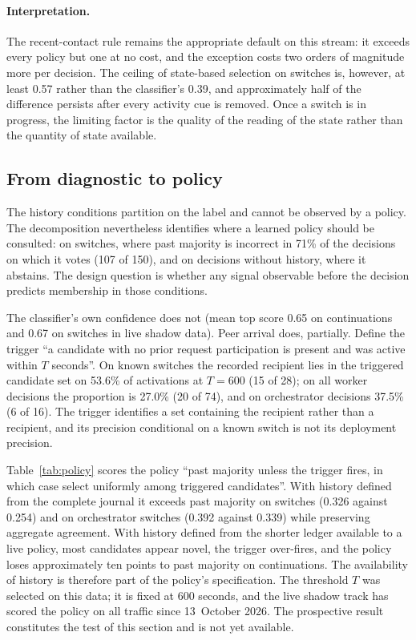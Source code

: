 \documentclass[11pt]{article}
\theoremstyle{definition}
\begin{document}
\paragraph{Interpretation.}
The recent-contact rule remains the appropriate default on this stream: it exceeds every policy but one at no cost, and the exception costs two orders of magnitude more per decision. The ceiling of state-based selection on switches is, however, at least 0.57 rather than the classifier's 0.39, and approximately half of the difference persists after every activity cue is removed. Once a switch is in progress, the limiting factor is the quality of the reading of the state rather than the quantity of state available.

\subsection{From diagnostic to policy}
\label{sec:policy}

The history conditions partition on the label and cannot be observed by a policy. The decomposition nevertheless identifies where a learned policy should be consulted: on switches, where past majority is incorrect in 71\% of the decisions on which it votes (107 of 150), and on decisions without history, where it abstains. The design question is whether any signal observable before the decision predicts membership in those conditions.

The classifier's own confidence does not (mean top score 0.65 on continuations and 0.67 on switches in live shadow data). Peer arrival does, partially. Define the trigger ``a candidate with no prior request participation is present and was active within $T$ seconds''. On known switches the recorded recipient lies in the triggered candidate set on 53.6\% of activations at $T = 600$ (15 of 28); on all worker decisions the proportion is 27.0\% (20 of 74), and on orchestrator decisions 37.5\% (6 of 16). The trigger identifies a set containing the recipient rather than a recipient, and its precision conditional on a known switch is not its deployment precision.

Table~\ref{tab:policy} scores the policy ``past majority unless the trigger fires, in which case select uniformly among triggered candidates''. With history defined from the complete journal it exceeds past majority on switches (0.326 against 0.254) and on orchestrator switches (0.392 against 0.339) while preserving aggregate agreement. With history defined from the shorter ledger available to a live policy, most candidates appear novel, the trigger over-fires, and the policy loses approximately ten points to past majority on continuations. The availability of history is therefore part of the policy's specification. The threshold $T$ was selected on this data; it is fixed at 600 seconds, and the live shadow track has scored the policy on all traffic since 13~October 2026. The prospective result constitutes the test of this section and is not yet available.
\end{document}
